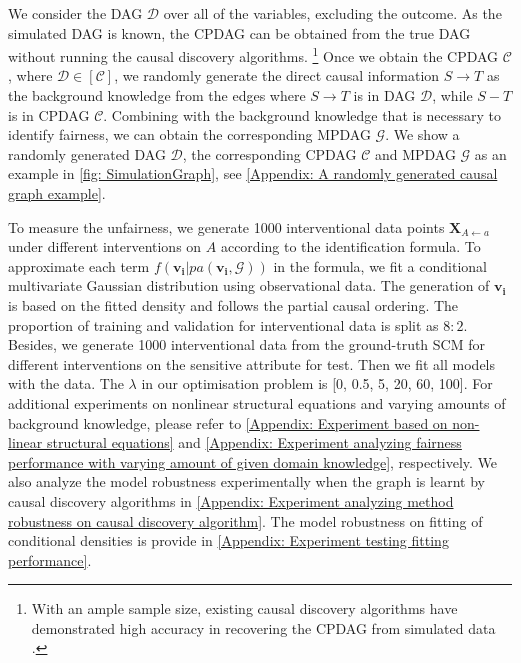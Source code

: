 \documentclass{article} %
\begin{document}
We consider the DAG $\mathcal{D}$ over all of the variables, excluding the outcome. As the simulated DAG is known, the CPDAG can be obtained from the true DAG without running the causal discovery algorithms.
\footnote{With an ample sample size, existing causal discovery algorithms have demonstrated high accuracy in recovering the CPDAG from simulated data \cite{glymour2019review}.} 
Once we obtain the CPDAG $\mathcal{C}$, where $\mathcal{D} \in [\mathcal{C}]$, we randomly generate the direct causal information $S \rightarrow T$ as the background knowledge from the edges where $S \rightarrow T$ is in DAG $\mathcal{D}$, while $S - T$ is in CPDAG $\mathcal{C}$. Combining with the background knowledge that is necessary to identify fairness, we can obtain the corresponding MPDAG $\mathcal{G}$. We show a randomly generated DAG $\mathcal{D}$, the corresponding CPDAG $\mathcal{C}$ and MPDAG $\mathcal{G}$ as an example in \cref{fig: SimulationGraph}, see \cref{Appendix: A randomly generated causal graph example}.

To measure the unfairness, we generate 1000 interventional data points $\mathbf{X}_{A \leftarrow a}$ under different interventions on $A$ according to the identification formula. 
To approximate each term $f(\mathbf{v_i}|pa(\mathbf{v_i, \mathcal{G}}))$ in the formula, we fit a conditional multivariate Gaussian distribution using observational data.  The generation of $\mathbf{v_i}$ is based on the fitted density and follows the partial causal ordering. The proportion of training and validation for interventional data is split as $8:2$. 
Besides, we generate 1000 interventional data from the ground-truth SCM for different interventions on the sensitive attribute for test. Then we fit all models with the data. The $\lambda$ in our optimisation problem is [0, 0.5, 5, 20, 60, 100]. For additional experiments on nonlinear structural equations and varying amounts of background knowledge, please refer to \cref{Appendix: Experiment based on non-linear structural equations} and \cref{Appendix: Experiment analyzing fairness performance with varying amount of given domain knowledge}, respectively. We also analyze the model robustness experimentally when the graph is learnt by causal discovery algorithms in \cref{Appendix: Experiment analyzing method robustness on causal discovery algorithm}. The model robustness on fitting of conditional densities is provide in \cref{Appendix: Experiment testing fitting performance}.
\end{document}
